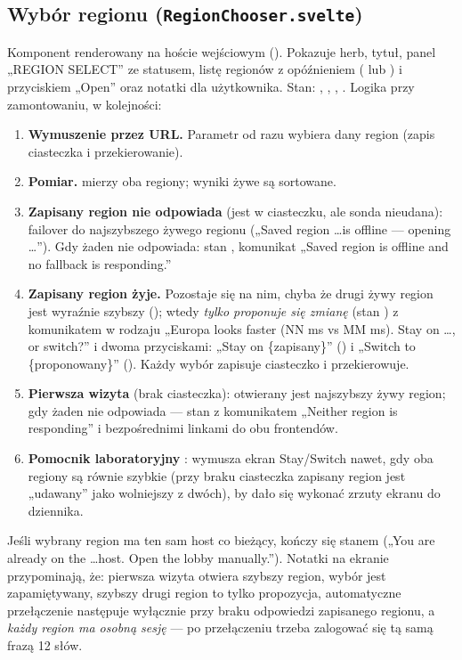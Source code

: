 \subsection{Wybór regionu (\texttt{RegionChooser.svelte})}

Komponent renderowany na hoście wejściowym (). Pokazuje herb, tytuł, panel
„REGION SELECT” ze statusem, listę regionów z opóźnieniem ( lub ) i
przyciskiem „Open” oraz notatki dla użytkownika. Stan: , ,
, . Logika przy zamontowaniu, w kolejności:

\begin{enumerate}[nosep]
  \item \textbf{Wymuszenie przez URL.} Parametr  od razu wybiera dany region
        (zapis ciasteczka i przekierowanie).
  \item \textbf{Pomiar.}  mierzy oba regiony; wyniki żywe są sortowane.
  \item \textbf{Zapisany region nie odpowiada} (jest w ciasteczku, ale sonda nieudana): failover do
        najszybszego żywego regionu („Saved region \ldots is offline --- opening \ldots”). Gdy żaden nie
        odpowiada: stan , komunikat „Saved region is offline and no fallback is responding.”
  \item \textbf{Zapisany region żyje.} Pozostaje się na nim, chyba że drugi żywy region jest
        wyraźnie szybszy (); wtedy \emph{tylko proponuje się zmianę} (stan
        ) z komunikatem w rodzaju „Europa looks faster (NN ms vs MM ms). Stay on \ldots,
        or switch?” i dwoma przyciskami: „Stay on \{zapisany\}” () i „Switch to
        \{proponowany\}” (). Każdy wybór zapisuje ciasteczko i przekierowuje.
  \item \textbf{Pierwsza wizyta} (brak ciasteczka): otwierany jest najszybszy żywy region; gdy żaden nie
        odpowiada --- stan  z komunikatem „Neither region is responding” i bezpośrednimi
        linkami do obu frontendów.
  \item \textbf{Pomocnik laboratoryjny} : wymusza ekran Stay/Switch nawet, gdy oba
        regiony są równie szybkie (przy braku ciasteczka zapisany region jest „udawany” jako wolniejszy
        z dwóch), by dało się wykonać zrzuty ekranu do dziennika.
\end{enumerate}

Jeśli wybrany region ma ten sam host co bieżący,  kończy się stanem 
(„You are already on the \ldots host. Open the lobby manually.”). Notatki na ekranie przypominają, że:
pierwsza wizyta otwiera szybszy region, wybór jest zapamiętywany, szybszy drugi region to tylko
propozycja, automatyczne przełączenie następuje wyłącznie przy braku odpowiedzi zapisanego regionu, a
\emph{każdy region ma osobną sesję} --- po przełączeniu trzeba zalogować się tą samą frazą 12 słów.

